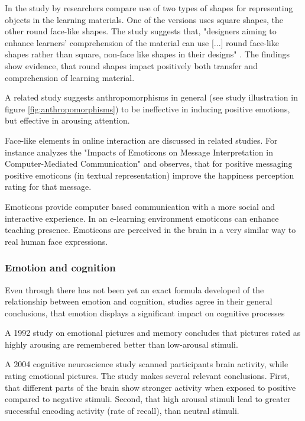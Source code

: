 		
		In the study by \cite{Plass2014} researchers compare use of two types of shapes for representing objects in the learning materials. One of the versions uses square shapes, the other round face-like shapes. The study suggests that, "designers aiming to enhance learners’ comprehension of the material can use [...] round face-like shapes rather than square, non-face like shapes in their designs" \cite{Plass2014}. The findings show evidence, that round shapes impact positively both transfer and comprehension of learning material.
		
		A related study \cite{Park2015} suggests anthropomorphisms in general (see study illustration in figure \ref{fig:anthropomorphisms}) to be ineffective in inducing positive emotions, but effective in arousing attention.
		
		Face-like elements in online interaction are discussed in related studies.
		For instance \cite{Walther2001} analyzes the "Impacts of Emoticons on Message Interpretation in Computer-Mediated Communication" and observes, that for positive messaging positive emoticons (in textual representation) improve the happiness perception rating for that message.  
		
		Emoticons provide computer based communication with a more social and interactive experience. In an e-learning environment emoticons can enhance teaching presence. \cite{Dunlap2016}
		Emoticons are perceived in the brain in a very similar way to real human face expressions. \cite{Churches2014}
		
		\subsubsection{Emotion and cognition} \label{sec:emotion-cognition}
		
		Even through there has not been yet an exact formula developed of the relationship between emotion and cognition, studies agree in their general conclusions, that emotion displays a significant impact on cognitive processes \cite{Sakaki2012, Leutner2014}
		
		A 1992 study \cite{Bradley1992} on emotional pictures and memory concludes that pictures rated as highly arousing are remembered better than low-arousal stimuli.
		
		A 2004 cognitive neuroscience study \cite{Dolcos2004} scanned participants brain activity, while rating emotional pictures. The study makes several relevant conclusions. First, that different parts of the brain show stronger activity when exposed to positive compared to negative stimuli. Second, that high arousal stimuli lead to greater successful encoding activity (rate of recall), than neutral stimuli. 
		

